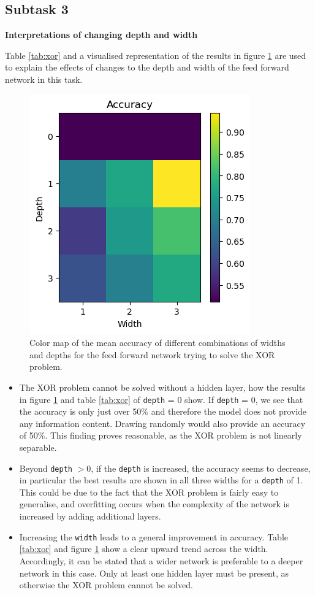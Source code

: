 \subsection*{Subtask 3}

\textbf{Interpretations of changing depth and width}

Table \ref{tab:xor} and a visualised representation of the results in figure \ref{fig:xor} are used to explain the effects of changes to the depth and width of the feed forward network in this task.

\begin{figure}[!htb]
    \centering
    \includegraphics[width=0.4\linewidth]{Assignment_1//Report/ex_1_acc.png}
    \caption{Color map of the mean accuracy of different combinations of widths and depths for the feed forward network trying to solve the XOR problem.}
    \label{fig:xor}
\end{figure}

\begin{itemize}
    \item The XOR problem cannot be solved without a hidden layer, how the results in figure \ref{fig:xor} and table \ref{tab:xor} of \lstinline|depth| = 0 show. If \lstinline|depth| = 0, we see that the accuracy is only just over 50\% and therefore the model does not provide any information content. Drawing randomly would also provide an accuracy of 50\%. This finding proves reasonable, as the XOR problem is not linearly separable.
    \item Beyond \lstinline|depth| $>0$, if the \lstinline|depth| is increased, the accuracy seems to decrease, in particular the best results are shown in all three widths for a \lstinline|depth| of 1. This could be due to the fact that the XOR problem is fairly easy to generalise, and overfitting occurs when the complexity of the network is increased by adding additional layers.
    \item Increasing the \lstinline|width| leads to a general improvement in accuracy. Table \ref{tab:xor} and figure \ref{fig:xor} show a clear upward trend across the width. Accordingly, it can be stated that a wider network is preferable to a deeper network in this case. Only at least one hidden layer must be present, as otherwise the XOR problem cannot be solved.
\end{itemize}

